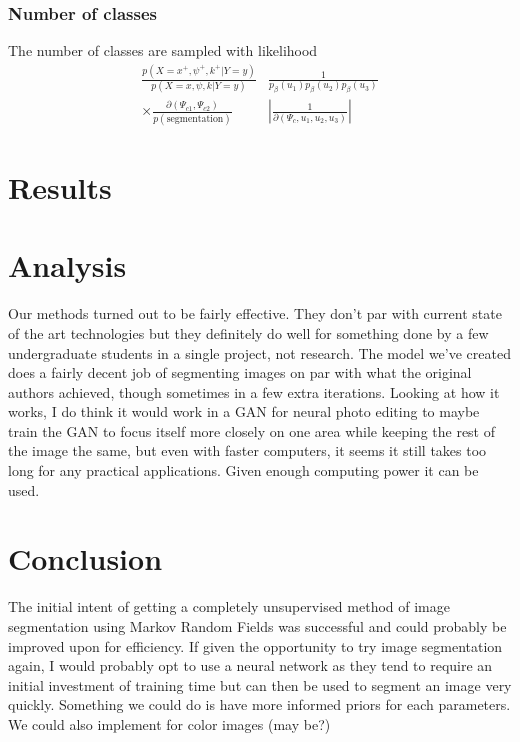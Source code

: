 \documentclass[11pt]{article}
\begin{document}
\subsubsection{Number of classes}
The number of classes are sampled with likelihood
\begin{equation}
\begin{aligned}
\frac{p\left(X=x^{+}, \psi^{+}, k^{+} | Y=y\right)}{p(X=x, \psi, k | Y=y)} & \frac{1}{p_{\beta}\left(u_{1}\right) p_{\beta}\left(u_{2}\right) p_{\beta}\left(u_{3}\right)} \\
\times \frac{\partial\left(\Psi_{c 1}, \Psi_{c 2}\right)}{p(\text {segmentation})} &\left|\frac{1}{\partial\left(\Psi_{c}, u_{1}, u_{2}, u_{3}\right)}\right|
\end{aligned}
\end{equation}

\section{Results}


\section{Analysis}
Our methods turned out to be fairly effective. They don’t par with current state of the art technologies but they definitely do well for something done by a few undergraduate students in a single project, not research. The model we’ve created does a fairly decent job of segmenting images on par with what the original authors achieved, though sometimes in a few extra iterations. Looking at how it works, I do think it would work in a GAN for neural photo editing to maybe train the GAN to focus itself more closely on one area while keeping the rest of the image the same, but even with faster computers, it seems it still takes too long for any practical applications. Given enough computing power it can be used. 

\section{Conclusion}
The initial intent of getting a completely unsupervised method of image segmentation using Markov Random Fields was successful and could probably be improved upon for efficiency. If given the opportunity to try image segmentation again, I would probably opt to use a neural network as they tend to require an initial investment of training time but can then be used to segment an image very quickly. Something we could do is have more informed priors for each parameters. We could also implement for color images (may be?)
\end{document}
